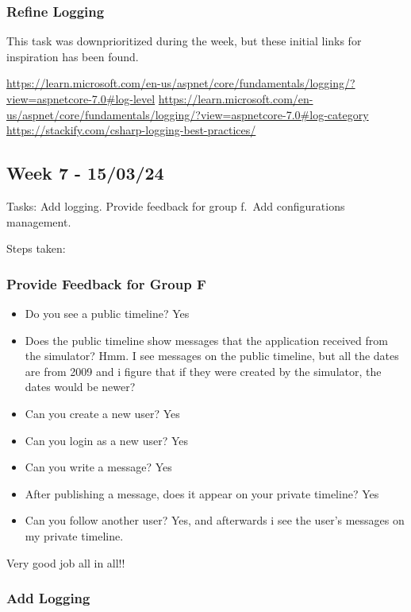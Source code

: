 \subsubsection{Refine Logging}
\label{log:refine-logging}

This task was downprioritized during the week, but these initial links
for inspiration has been found.

\url{https://learn.microsoft.com/en-us/aspnet/core/fundamentals/logging/?view=aspnetcore-7.0\#log-level}
\url{https://learn.microsoft.com/en-us/aspnet/core/fundamentals/logging/?view=aspnetcore-7.0\#log-category}
\url{https://stackify.com/csharp-logging-best-practices/}

\subsection{Week 7 - 15/03/24}
\label{log:week7}

Tasks: Add logging. Provide feedback for group f.~Add configurations
management.

Steps taken:

\subsubsection{Provide Feedback for Group F}
\label{log:provide-feedback-for-group-f}

\begin{itemize}
    \item Do you see a public timeline? Yes
    \item Does the public timeline show messages that the application received from the simulator? Hmm. I see messages on the public timeline, but all the dates are from 2009 and i figure that if they were created by the simulator, the dates would be newer?
    \item Can you create a new user? Yes
    \item Can you login as a new user? Yes
    \item Can you write a message? Yes
    \item After publishing a message, does it appear on your private timeline? Yes
    \item Can you follow another user? Yes, and afterwards i see the user's messages on my private timeline.
\end{itemize}

Very good job all in all!!

\subsubsection{Add Logging}
\label{log:add-logging}

